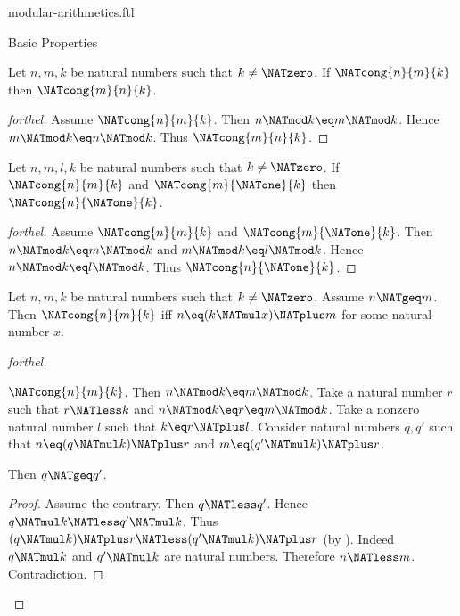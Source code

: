 \documentclass{naproche-library}
\begin{document}
\begin{smodule}[title=Modular Arithmetics]{modular-arithmetics.ftl}
\begin{sfragment}{Basic Properties}
  \begin{proposition}[forthel,id=ARITHMETIC_08_2337210737098752]
    Let $n, m, k$ be natural numbers such that $k \neq \NATzero$.
    If $\NATcong{n}{m}{k}$ then $\NATcong{m}{n}{k}$.
  \end{proposition}
  \begin{proof}[forthel]
    Assume $\NATcong{n}{m}{k}$.
    Then $n \NATmod k \eq m \NATmod k$.
    Hence $m \NATmod k \eq n \NATmod k$.
    Thus $\NATcong{m}{n}{k}$.
  \end{proof}

  \begin{proposition}[forthel,id=ARITHMETIC_08_7464329746055168]
    Let $n, m, l, k$ be natural numbers such that $k \neq \NATzero$.
    If $\NATcong{n}{m}{k}$ and $\NATcong{m}{\NATone}{k}$ then $\NATcong{n}{\NATone}{k}$.
  \end{proposition}
  \begin{proof}[forthel]
    Assume $\NATcong{n}{m}{k}$ and $\NATcong{m}{\NATone}{k}$.
    Then $n \NATmod k \eq m \NATmod k$ and $m \NATmod k \eq l \NATmod k$.
    Hence $n \NATmod k \eq l \NATmod k$.
    Thus $\NATcong{n}{\NATone}{k}$.
  \end{proof}

  \begin{proposition}[forthel,id=ARITHMETIC_08_2034122983735296]
    Let $n, m, k$ be natural numbers such that $k \neq \NATzero$.
    Assume $n \NATgeq m$.
    Then $\NATcong{n}{m}{k}$ iff $n \eq (k \NATmul x) \NATplus m$ for some natural number $x$.
  \end{proposition}
  \begin{proof}[forthel]
    \begin{case}{$\NATcong{n}{m}{k}$.}
      Then $n \NATmod k \eq m \NATmod k$.
      Take a natural number $r$ such that $r \NATless k$ and $n \NATmod k \eq r \eq m \NATmod k$.
      Take a nonzero natural number $l$ such that $k \eq r \NATplus l$.
      Consider natural numbers $q,q'$ such that $n \eq (q \NATmul k) \NATplus r$ and $m \eq (q' \NATmul k) \NATplus r$.

      Then $q \NATgeq q'$.
      \begin{proof}
        Assume the contrary.
        Then $q \NATless q'$.
        Hence $q \NATmul k \NATless q' \NATmul k$.
        Thus $(q \NATmul k) \NATplus r \NATless (q' \NATmul k) \NATplus r$ (by ).
        Indeed $q \NATmul k$ and $q' \NATmul k$ are natural numbers.
        Therefore $n \NATless m$.
        Contradiction.
      \end{proof}


\end{case}
\end{proof}
\end{sfragment}
\end{smodule}
\end{document}
